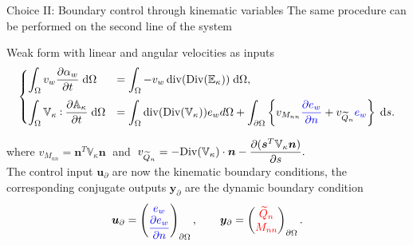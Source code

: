 \documentclass{beamer}
\def\onedot{$\mathsurround0pt\ldotp$}
\def\cddot{%
	\mathbin{\vcenter{\baselineskip.67ex
			\hbox{\onedot}\hbox{\onedot}}%
}}
\newcommand{\blue}[1]{\textcolor{blue}{#1}}
\newcommand{\red}[1]{\textcolor{red}{#1}}
\begin{document}
\begin{frame}{Choice II: Boundary control through kinematic variables}
	The same procedure can be performed on the second line of the system 
	\begin{exampleblock}{Weak form with linear and angular velocities as inputs}
	\small
	\begin{equation*}
	\begin{cases}
	\displaystyle\int_{\Omega} v_w \diffp{\alpha_w}{t} \d\Omega&=  \displaystyle\int_{\Omega} -v_w \, \mathrm{div}(\mathrm{Div}(\mathbb{E}_{\kappa}))  \d\Omega, \vspace{2mm}\\
	\displaystyle\int_{\Omega} \mathbb{V}_{\kappa} \cddot \diffp{\mathbb{A}_{\kappa}}{t}   \d\Omega&= \displaystyle\int_{\Omega} \mathrm{div}(\mathrm{Div}(\mathbb{V}_{\kappa})) e_w  d\Omega +  \displaystyle\int_{\partial \Omega} \left\{ {v}_{M_{nn}} \blue{\diffp{e_w}{n}}  + v_{\widetilde{Q}_n} \blue{e_w} \right\} \d{s}. 
	\end{cases}
	\end{equation*}
	\end{exampleblock}
	\normalsize
	where ${v}_{M_{nn}} = \bm{n}^T \mathbb{V}_{\kappa} \bm{n} \; $ and $ \; v_{\widetilde{Q}_n} = - \displaystyle \mathrm{Div}(\mathbb{V}_{\kappa}) \cdot \bm{n} - \diffp{ (\bm{s}^T \mathbb{V}_{\kappa} \bm{n}) }{s}.$ \\
	The control input $\bm{u}_\partial$ are now the kinematic boundary conditions, the corresponding conjugate outputs $\bm{y}_\partial$ are the dynamic boundary condition
	\[\bm{u}_\partial = 
	\begin{pmatrix}
	\blue{e_w} \\
	\displaystyle \blue{\diffp{e_w}{n}} \\
	\end{pmatrix}_{\partial \Omega}, \qquad
	\bm{y}_\partial = 
	\begin{pmatrix}
	\red{\widetilde{Q}_n} \\
	\red{M_{nn}} \\
	\end{pmatrix}_{\partial \Omega}.
	\]
\end{frame}
\end{document}
